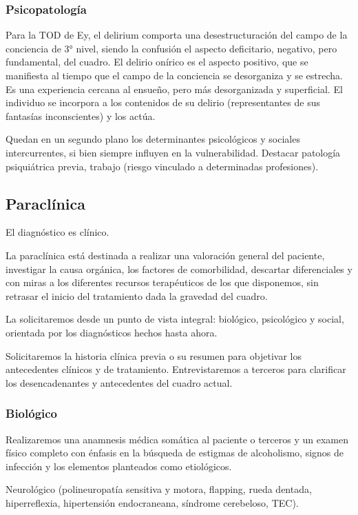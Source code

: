 \documentclass{scrbook}
\begin{document}
\subsubsection*{Psicopatología}
Para la TOD de Ey, el delirium comporta una desestructuración del campo de la conciencia de 3° nivel, siendo la confusión el aspecto deficitario, negativo, pero fundamental, del cuadro. El delirio onírico es el aspecto positivo, que se manifiesta al tiempo que el campo de la conciencia se desorganiza y se estrecha. Es una experiencia cercana al ensueño, pero más desorganizada y superficial. El individuo se incorpora a los contenidos de su delirio (representantes de sus fantasías inconscientes) y los actúa.

Quedan en un segundo plano los determinantes psicológicos y sociales intercurrentes, si bien siempre influyen en la vulnerabilidad. Destacar patología psiquiátrica previa, trabajo (riesgo vinculado a determinadas profesiones).

\subsection*{Paraclínica}

El diagnóstico es clínico.

La paraclínica está destinada a realizar una valoración general del paciente, investigar la causa orgánica, los factores de comorbilidad, descartar diferenciales y con miras a los diferentes recursos terapéuticos de los que disponemos, sin retrasar el inicio del tratamiento dada la gravedad del cuadro.

La solicitaremos desde un punto de vista integral: biológico, psicológico y social, orientada por los diagnósticos hechos hasta ahora.

Solicitaremos la historia clínica previa o su resumen para objetivar los antecedentes clínicos y de tratamiento. Entrevistaremos a terceros para clarificar los desencadenantes y antecedentes del cuadro actual.

\subsubsection*{Biológico}

Realizaremos una anamnesis médica somática al paciente o terceros y un examen físico completo con énfasis en la búsqueda de estigmas de alcoholismo, signos de infección y los elementos planteados como etiológicos.

Neurológico (polineuropatía sensitiva y motora, flapping, rueda dentada, hiperreflexia, hipertensión endocraneana, síndrome cerebeloso, TEC).
\end{document}
